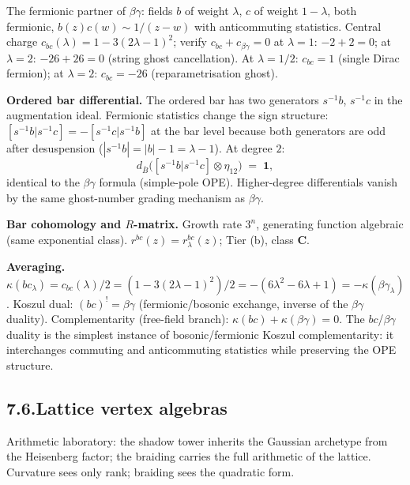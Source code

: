 \documentclass[11pt,reqno]{amsart}
\theoremstyle{definition}
\theoremstyle{remark}
\providecommand{\barB}{\bar{B}}
\numberwithin{equation}{section}
\begin{document}
The fermionic partner of $\beta\gamma$: fields $b$ of weight
$\lambda$, $c$ of weight $1-\lambda$, both fermionic,
$b(z)c(w) \sim 1/(z-w)$ with anticommuting statistics. Central
charge $c_{bc}(\lambda) = 1 - 3(2\lambda - 1)^2$; verify
$c_{bc} + c_{\beta\gamma} = 0$ at $\lambda = 1$: $-2 + 2 = 0$;
at $\lambda = 2$: $-26 + 26 = 0$ (string ghost cancellation).
At $\lambda = 1/2$: $c_{bc} = 1$ (single Dirac fermion); at
$\lambda = 2$: $c_{bc} = -26$ (reparametrisation ghost).

\medskip\noindent\textbf{Ordered bar differential.}\enspace
The ordered bar has two generators $s^{-1}b$, $s^{-1}c$ in the
augmentation ideal. Fermionic statistics change the sign
structure: $[s^{-1}b | s^{-1}c] = -[s^{-1}c | s^{-1}b]$ at
the bar level because both generators are odd after
desuspension ($|s^{-1}b| = |b| - 1 = \lambda - 1$). At
degree $2$:
\[
d_{\barB}\bigl([s^{-1}b|s^{-1}c]\otimes\eta_{12}\bigr)
\;=\;\mathbf{1},
\]
identical to the $\beta\gamma$ formula (simple-pole OPE).
Higher-degree differentials vanish by the same ghost-number
grading mechanism as $\beta\gamma$.

\medskip\noindent\textbf{Bar cohomology and $R$-matrix.}\enspace
Growth rate $3^n$, generating function algebraic (same exponential
class). $r^{bc}(z) = r_\lambda^{bc}(z)$; Tier (b),
class $\mathbf{C}$.

\medskip\noindent\textbf{Averaging.}\enspace
$\kappa(bc_\lambda) = c_{bc}(\lambda)/2
= (1 - 3(2\lambda-1)^2)/2 = -(6\lambda^2 - 6\lambda + 1)
= -\kappa(\beta\gamma_\lambda)$.
Koszul dual: $(bc)^! = \beta\gamma$ (fermionic/bosonic exchange,
inverse of the $\beta\gamma$ duality). Complementarity
(free-field branch): $\kappa(bc) + \kappa(\beta\gamma) = 0$.
The $bc$/$\beta\gamma$ duality is the simplest instance of
bosonic/fermionic Koszul complementarity: it interchanges
commuting and anticommuting statistics while preserving the
OPE structure.

\subsection*{7.6.\quad Lattice vertex algebras}

Arithmetic laboratory: the shadow tower inherits the Gaussian
archetype from the Heisenberg factor; the braiding carries the
full arithmetic of the lattice. Curvature sees only rank;
braiding sees the quadratic form.
\end{document}
